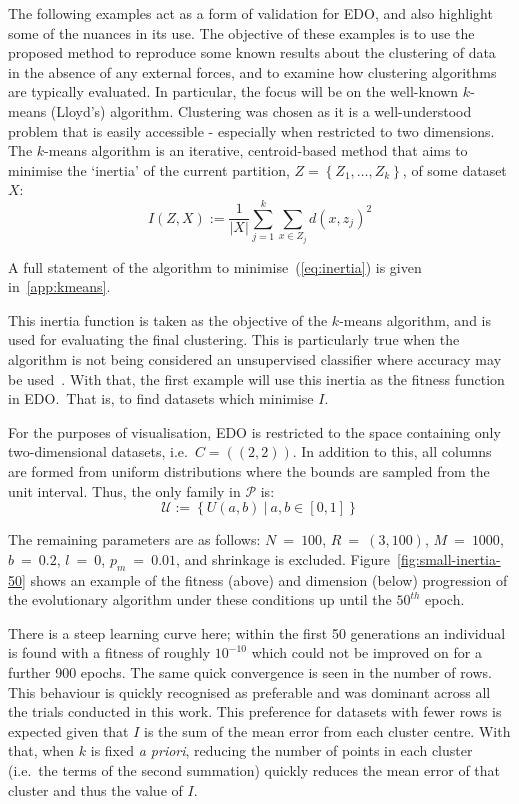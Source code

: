 \documentclass[smallextended]{svjour3}
\begin{document}
The following examples act as a form of validation for EDO, and also highlight
some of the nuances in its use. The objective of these examples is to use the
proposed method to reproduce some known results about the clustering of data in
the absence of any external forces, and to examine how clustering algorithms are
typically evaluated. In particular, the focus will be on the well-known
\(k\)-means (Lloyd's) algorithm. Clustering was chosen as it is a
well-understood problem that is easily accessible \-- especially when restricted
to two dimensions. The \(k\)-means algorithm is an iterative, centroid-based
method that aims to minimise the `inertia' of the current partition, \(Z =
\left\{Z_1, \ldots, Z_k\right\}\), of some dataset \(X\):
\begin{equation}
    I(Z, X) := \frac{1}{|X|} \sum_{j=1}^{k} \sum_{x \in Z_j} {d(x, z_j)}^2
    \label{eq:inertia}
\end{equation}

A full statement of the algorithm to minimise~(\ref{eq:inertia}) is given
in~\ref{app:kmeans}. 

This inertia function is taken as the objective of the \(k\)-means algorithm,
and is used for evaluating the final clustering. This is particularly true when
the algorithm is not being considered an unsupervised classifier where accuracy
may be used~\cite{Huang1998}. With that, the first example will use this inertia
as the fitness function in EDO.\ That is, to find datasets which minimise \(I\).

For the purposes of visualisation, EDO is restricted to the space containing
only two-dimensional datasets, i.e.\ \(C = \left((2, 2)\right)\). In addition to
this, all columns are formed from uniform distributions where the bounds are
sampled from the unit interval. Thus, the only family in \(\mathcal{P}\) is:
\begin{equation}
    \mathcal{U} := \left\{U(a, b)~|~a, b \in [0, 1]\right\}
\end{equation}

The remaining parameters are as follows: \(N~=~100\), \(R~=~(3, 100)\),
\(M~=~1000\), \(b~=~0.2\), \(l~=~0\), \(p_m~=~0.01\), and shrinkage is excluded.
Figure~\ref{fig:small-inertia-50} shows an example of the fitness (above) and
dimension (below) progression of the evolutionary algorithm under these
conditions up until the \(50^{th}\) epoch.

There is a steep learning curve here; within the first 50 generations an
individual is found with a fitness of roughly \(10^{-10}\) which could not be
improved on for a further 900 epochs. The same quick convergence is seen in the
number of rows. This behaviour is quickly recognised as preferable and was
dominant across all the trials conducted in this work. This preference for
datasets with fewer rows is expected given that \(I\) is the sum of the mean
error from each cluster centre. With that, when \(k\) is fixed \textit{a
priori}, reducing the number of points in each cluster (i.e.\ the terms of the
second summation) quickly reduces the mean error of that cluster and thus the
value of \(I\).
\end{document}
